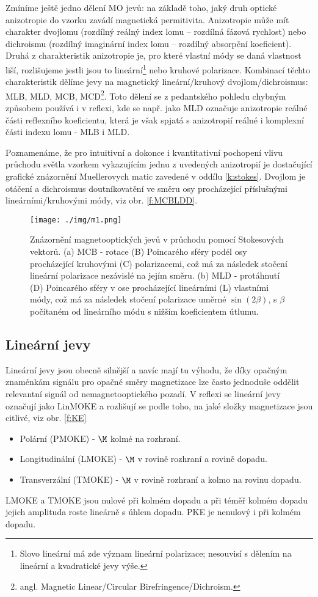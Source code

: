 Zmíníme ještě jedno dělení MO jevů: na základě toho, jaký druh optické anizotropie do vzorku zavádí magnetická permitivita.
Anizotropie může mít charakter dvojlomu (rozdílný reálný index lomu -- rozdílná fázová rychlost) nebo dichroismu (rozdílný imaginární index lomu -- rozdílný absorpční koeficient).
Druhá z charakteristik anizotropie je, pro které vlastní módy se daná vlastnost liší, rozlišujeme jestli jsou to lineární\footnote{Slovo lineární má zde význam lineární polarizace; nesouvisí s dělením na lineární a kvadratické jevy výše.} nebo kruhové polarizace.
Kombinací těchto charakteristik dělíme jevy na magnetický lineární/kruhový dvojlom/dichroismus: MLB, MLD, MCB, MCD\footnote{angl. Magnetic Linear/Circular Birefringence/Dichroism.}\cite{ZvezdinKotov}.
Toto dělení se z pedantského pohledu chybným způsobem používá i v reflexi, kde se např. jako MLD označuje anizotropie reálné části reflexního koeficientu, která je však spjatá s anizotropií reálné i komplexní části indexu lomu - MLB i MLD. \cite{systematicgamnas}

Poznamenáme, že pro intuitivní a dokonce i kvantitativní pochopení vlivu průchodu světla vzorkem vykazujícím jednu z uvedených anizotropií je dostačující grafické znázornění Muellerovych matic zavedené v oddílu \ref{k:stokes}.
Dvojlom je otáčení a dichroismus doutníkovatění ve směru osy procházející příslušnými lineárními/kruhovými módy, viz obr. \ref{f:MCBLDD}.

\begin{figure}\centering
\texttt{[image: ./img/m1.png]}
\caption{Znázornění magnetooptických jevů v průchodu pomocí Stokesových vektorů. (a) MCB - rotace (B) Poincarého sféry podél osy procházející kruhovými (C) polarizacemi, což má za následek stočení lineární polarizace nezávislé na jejím směru. (b) MLD - protáhnutí (D) Poincarého sféry v ose procházející lineárními (L) vlastními módy, což má za následek stočení polarizace uměrné $\sin(2\beta)$, s $\beta$ počítaném od lineárního módu s nižším koeficientem útlumu.}\label{f:MCBMLD}
\end{figure}

\subsection*{Lineární jevy}

Lineární jevy jsou obecně silnější a navíc mají tu výhodu, že díky opačným znaménkám signálu pro opačné směry magnetizace lze často jednoduše oddělit relevantní signál od nemagnetooptického pozadí.
V reflexi se lineární jevy označují jako LinMOKE a rozlišují se podle toho, na jaké složky magnetizace jsou citlivé, viz obr. \ref{f:KE}
\begin{itemize}
\item Polární (PMOKE) - $\M$ kolmé na rozhraní.
\item Longitudinální (LMOKE) - $\M$ v rovině rozhraní a rovině dopadu.
\item Transverzální (TMOKE) - $\M$ v rovině rozhraní a kolmo na rovinu dopadu.
\end{itemize}
LMOKE a TMOKE jsou nulové při kolmém dopadu a při téměř kolmém dopadu jejich amplituda roste lineárně s úhlem dopadu. PKE je nenulový i při kolmém dopadu.

